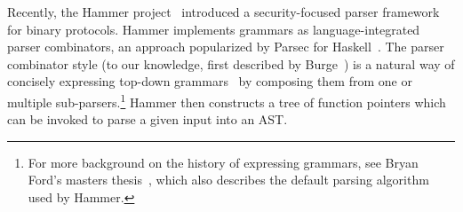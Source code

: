 \documentclass[a4paper]{article}
\begin{document}
Recently, the Hammer project~\cite{hammer-parser} introduced a security-focused parser framework for
binary protocols.
Hammer implements grammars as language-integrated parser combinators, an approach popularized by
Parsec for Haskell~\cite{LeijenMeijer:parsec}. The parser combinator style (to our knowledge, first
described by Burge~\cite{burge1975recursive}) is a natural way of concisely expressing top-down
grammars~\cite{Danielsson:2010:TPC:1863543.1863585}
by composing them from one or multiple sub-parsers.\footnote{For more
background on the history of expressing grammars, see Bryan Ford's
masters thesis~\cite{ford2002packrat}, which also describes the
default parsing algorithm used by Hammer.}
Hammer then constructs a tree of function pointers which can be invoked to parse a given input into
an AST\@.

\begin{singlespace}


\end{singlespace}
\end{document}
